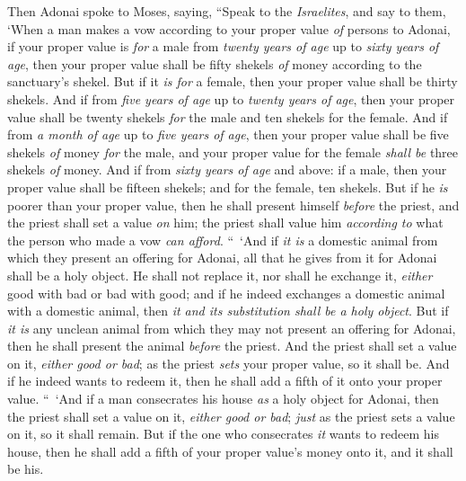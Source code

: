 \begin{biblechapter} %
 Then Adonai spoke to Moses, saying,
\verse “Speak to the \textit{Israelites}, and say to them, ‘When a man makes a vow according to your proper value \textit{of} persons to Adonai,
\verse if your proper value is \textit{for} a male from \textit{twenty years of age} up to \textit{sixty years of age}, then your proper value shall be fifty shekels \textit{of} money according to the sanctuary’s shekel.
\verse But if it \textit{is for} a female, then your proper value shall be thirty shekels.
\verse And if from \textit{five years of age} up to \textit{twenty years of age}, then your proper value shall be twenty shekels \textit{for} the male and ten shekels for the female.
\verse And if from \textit{a month of age} up to \textit{five years of age}, then your proper value shall be five shekels \textit{of} money \textit{for} the male, and your proper value for the female \textit{shall be} three shekels \textit{of} money.
\verse And if from \textit{sixty years of age} and above: if a male, then your proper value shall be fifteen shekels; and for the female, ten shekels.
\verse But if he \textit{is} poorer than your proper value, then he shall present himself \textit{before} the priest, and the priest shall set a value \textit{on} him; the priest shall value him \textit{according to} what the person who made a vow \textit{can afford}.
\verse “ ‘And if \textit{it is} a domestic animal from which they present an offering for Adonai, all that he gives from it for Adonai shall be a holy object.
\verse He shall not replace it, nor shall he exchange it, \textit{either} good with bad or bad with good; and if he indeed exchanges a domestic animal with a domestic animal, then \textit{it and its substitution shall be a holy object}.
\verse But if \textit{it is} any unclean animal from which they may not present an offering for Adonai, then he shall present the animal \textit{before} the priest.
\verse And the priest shall set a value on it, \textit{either good or bad}; as the priest \textit{sets} your proper value, so it shall be.
\verse And if he indeed wants to redeem it, then he shall add a fifth of it onto your proper value.
\verse “ ‘And if a man consecrates his house \textit{as} a holy object for Adonai, then the priest shall set a value on it, \textit{either good or bad}; \textit{just} as the priest sets a value on it, so it shall remain.
\verse But if the one who consecrates \textit{it} wants to redeem his house, then he shall add a fifth of your proper value’s money onto it, and it shall be his.

\end{biblechapter}
